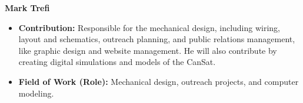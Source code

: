 \item[] \textbf{Mark Trefi}
    \begin{itemize}[label=]
        \item[\faEdit] \textbf{Contribution:} Responsible for the mechanical design, including wiring, layout and schematics, outreach planning, and public relations management, like graphic design and website management. He will also contribute by creating digital simulations and models of the CanSat.
        \item[\faMicroscope] \textbf{Field of Work (Role):} Mechanical design, outreach projects, and computer modeling.
    \end{itemize}